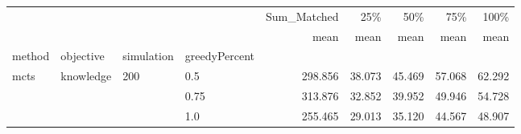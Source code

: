 \begin{tabular}{llllrrrrr}
\toprule
     &           &     &     & Sum\_Matched &    25\% &    50\% &    75\% &   100\% \\
     &           &     &     &        mean &   mean &   mean &   mean &   mean \\
method & objective & simulation & greedyPercent &             &        &        &        &        \\
\midrule
mcts & knowledge & 200 & 0.5 &     298.856 & 38.073 & 45.469 & 57.068 & 62.292 \\
     &           &     & 0.75 &     313.876 & 32.852 & 39.952 & 49.946 & 54.728 \\
     &           &     & 1.0 &     255.465 & 29.013 & 35.120 & 44.567 & 48.907 \\
\bottomrule
\end{tabular}
